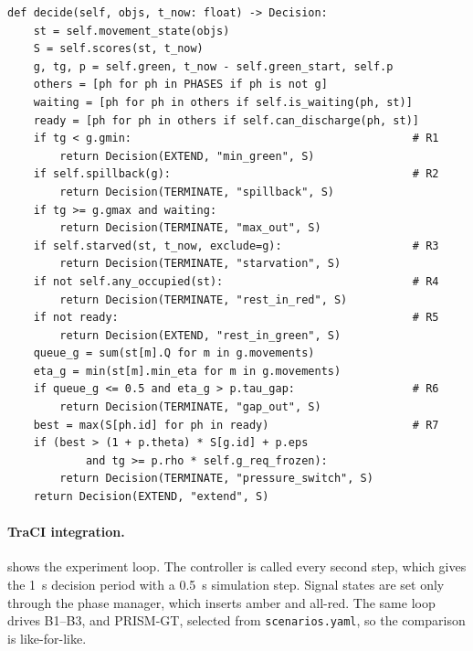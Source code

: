 \begin{lstlisting}[style=py,caption={The \texttt{decide()} rule cascade (\texttt{control/prism.py})},label={lst:impl-decide}]
def decide(self, objs, t_now: float) -> Decision:
    st = self.movement_state(objs)
    S = self.scores(st, t_now)
    g, tg, p = self.green, t_now - self.green_start, self.p
    others = [ph for ph in PHASES if ph is not g]
    waiting = [ph for ph in others if self.is_waiting(ph, st)]
    ready = [ph for ph in others if self.can_discharge(ph, st)]
    if tg < g.gmin:                                           # R1
        return Decision(EXTEND, "min_green", S)
    if self.spillback(g):                                     # R2
        return Decision(TERMINATE, "spillback", S)
    if tg >= g.gmax and waiting:
        return Decision(TERMINATE, "max_out", S)
    if self.starved(st, t_now, exclude=g):                    # R3
        return Decision(TERMINATE, "starvation", S)
    if not self.any_occupied(st):                             # R4
        return Decision(TERMINATE, "rest_in_red", S)
    if not ready:                                             # R5
        return Decision(EXTEND, "rest_in_green", S)
    queue_g = sum(st[m].Q for m in g.movements)
    eta_g = min(st[m].min_eta for m in g.movements)
    if queue_g <= 0.5 and eta_g > p.tau_gap:                  # R6
        return Decision(TERMINATE, "gap_out", S)
    best = max(S[ph.id] for ph in ready)                      # R7
    if (best > (1 + p.theta) * S[g.id] + p.eps
            and tg >= p.rho * self.g_req_frozen):
        return Decision(TERMINATE, "pressure_switch", S)
    return Decision(EXTEND, "extend", S)
\end{lstlisting}

\paragraph{TraCI integration.}  shows the experiment loop. The controller is called
every second step, which gives the 1~s decision period with a 0.5~s simulation step. Signal states are
set only through the phase manager, which inserts amber and all-red. The same loop drives B1--B3,
\prism{} and PRISM-GT, selected from \texttt{scenarios.yaml}, so the comparison is like-for-like.

